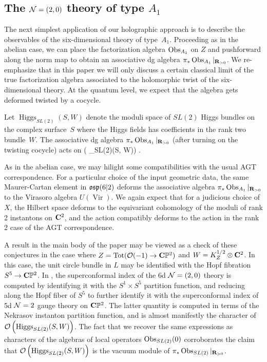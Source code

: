\subsection*{The $\mathcal N=(2,0)$ theory of type $A_1$} 


The next simplest application of our holographic approach is to describe the observables of the six-dimensional theory of type~$A_1$. 
Proceeding as in the abelian case, we can place the factorization algebra $\operatorname{Obs}_{A_1}$ on $Z$ and pushforward along the norm map to obtain an associative dg algebra $\pi_{*} \operatorname{Obs}_{A_1}|_{\mathbf{R}_{>0}}$. We re-emphasize that in this paper we will only discuss a certain classical limit of the true factorization algebra associated to the holomorphic twist of the six-dimensional theory. At the quantum level, we expect that the algebra gets deformed twisted by a cocycle.

\begin{conj}
Let $\operatorname{Higgs}_{SL(2)} (S,W)$ denote the moduli space of $SL(2)$ Higgs bundles on the complex surface~$S$ where the Higgs fields has coefficients in the rank two bundle~$W$.
The associative dg algebra $\pi_{*} \operatorname{Obs}_{A_1}|_{\mathbf{R}_{>0}}$ (after turning on the twisting cocycle) acts on
  \beqn
  \cO \left (  _{SL(2)}(S, W)\right) .
  \eeqn
\end{conj}

As in the abelian case, we may hilight some compatibilities with the usual AGT correspondence. For a particular choice of the input geometric data, the same Maurer-Cartan element in $\mathfrak{osp}(6|2)$ deforms the associative algebra $\pi_{*}\operatorname{Obs}_{A_{1}}|_{\mathbf{R}_{>0}}$ to the Virasoro algebra $U(\operatorname{Vir})$. We again expect that for a judicious choice of $X$, the Hilbert space deforms to the equivariant cohomology of the moduli of rank 2 instantons on $\mathbf{C}^{2}$, and the action compatibly deforms to the action in the rank 2 case of the AGT correspondence.

A result in the main body of the paper may be viewed as a check of these conjectures in the case where $Z = \operatorname{Tot}(\mathcal O(-1)\to \mathbf{C}\mathbb P^{2})$ and $W = K^{1/2}_{Z}\otimes \mathbf{C}^{2}$. In this case, the unit circle bundle in $L$ may be identified with the Hopf fibration $S^{5}\to \mathbf{C}\mathbb P^{2}$. In \cite{Kim:2013nva}, the superconformal index of the 6d $\mathcal N=(2,0)$ theory is computed by identifying it with the $S^{1}\times S^{5}$ partition function, and reducing along the Hopf fiber of $S^{5}$ to further identify it with the superconformal index of 5d $\mathcal N=2$ gauge theory on $\mathbf{C}\mathbb P^{2}$. The latter quantity is computed in terms of the Nekrasov instanton partition function, and is almost manifestly the character of $\mathcal O \left ( \operatorname{Higgs} _{SL(2)}(S, W)\right)$. The fact that we recover the same expressions as characters of the algebras of local operators $\operatorname{Obs}_{SL(2)}(0)$ corroborates the claim that $ \mathcal O \left ( \operatorname{Higgs} _{SL(2)}(S, W)\right)$ is the vacuum module of $\pi_{*}\operatorname{Obs}_{SL(2)}|_{\mathbf{R}_{>0}}$.





%
